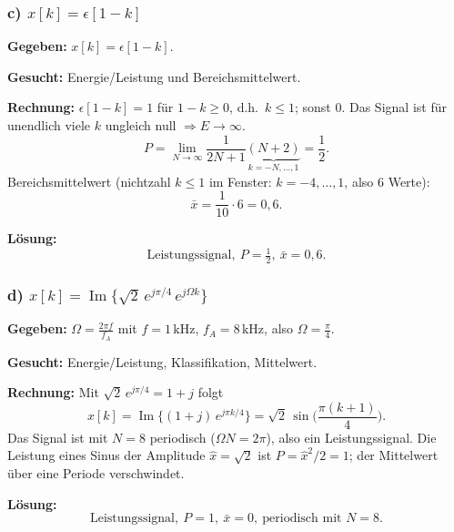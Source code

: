 \subsubsection*{c) $x[k] = \epsilon[1-k]$}

\begin{beispiel}

\textbf{Gegeben:} $x[k]=\epsilon[1-k]$.

\textbf{Gesucht:} Energie/Leistung und Bereichsmittelwert.

\textbf{Rechnung:} $\epsilon[1-k]=1$ für $1-k\geq 0$, d.h.\ $k\leq 1$; sonst $0$.
Das Signal ist für unendlich viele $k$ ungleich null $\Rightarrow E\to\infty$.
$$
P = \lim_{N\to\infty}\frac{1}{2N+1}\underbrace{(N+2)}_{k=-N,\ldots,1}
= \frac{1}{2}.
$$
Bereichsmittelwert (nichtzahl $k\leq 1$ im Fenster: $k=-4,\ldots,1$, also $6$ Werte):
$$
\bar{x} = \frac{1}{10}\cdot 6 = 0{,}6.
$$

\textbf{Lösung:}
$$
\boxed{\;\text{Leistungssignal},\ P=\tfrac12,\ \bar{x}=0{,}6.\;}
$$
\end{beispiel}

\subsubsection*{d) $x[k] = \operatorname{Im}\big\{\sqrt{2}\,e^{j\pi/4}\,e^{j\Omega k}\big\}$}

\begin{beispiel}

\textbf{Gegeben:} $\Omega = \tfrac{2\pi f}{f_A}$ mit $f=1\,\text{kHz}$, $f_A=8\,\text{kHz}$,
also $\Omega=\tfrac{\pi}{4}$.

\textbf{Gesucht:} Energie/Leistung, Klassifikation, Mittelwert.

\textbf{Rechnung:} Mit $\sqrt{2}\,e^{j\pi/4}=1+j$ folgt
$$
x[k] = \operatorname{Im}\big\{(1+j)\,e^{j\pi k/4}\big\}
= \sqrt{2}\,\sin\!\Big(\frac{\pi(k+1)}{4}\Big).
$$
Das Signal ist mit $N=8$ periodisch ($\Omega N = 2\pi$), also ein
Leistungssignal. Die Leistung eines Sinus der Amplitude $\hat{x}=\sqrt2$ ist
$P=\hat{x}^2/2 = 1$; der Mittelwert über eine Periode verschwindet.

\textbf{Lösung:}
$$
\boxed{\;\text{Leistungssignal},\ P=1,\ \bar{x}=0,\ \text{periodisch mit } N=8.\;}
$$
\end{beispiel}


